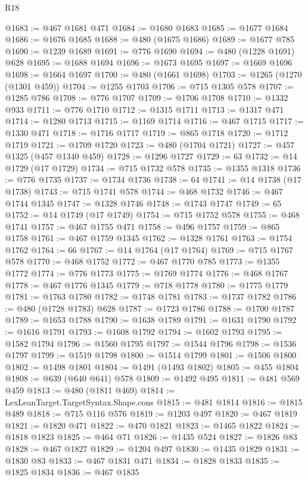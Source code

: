 \begin{lexlean}{R18}
\begin{coremodule}
{{{{{{{{{{{{{{{{{{{{{{{{{{{{{{{{{{{{{{{{{{{{{{{{{{{{{{{{{{{{{{{{{{{{{{{{{{{{{{{{{{{{{{{{{{{{{{{{{{{{{{{{{{{{{@1683 := @467 @1681 @471
@1684 := @1680 @1683
@1685 := @1677 @1684
@1686 := @1676 @1685
@1688 := @480 (@1675 @1686)
@1689 := @1677 @785
@1690 := @1239 @1689
@1691 := @776 @1690
@1694 := @480 (@1228 @1691) @628
@1695 := @1688 @1694
@1696 := @1673 @1695
@1697 := @1669 @1696
@1698 := @1664 @1697
@1700 := @480 (@1661 @1698)
@1703 := @1265 (@1270 (@1301 @459))
@1704 := @1255 @1703
@1706 := @715 @1305 @578
@1707 := @1285 @786
@1708 := @776 @1707
@1709 := @1706 @1708
@1710 := @1332 @933
@1711 := @776 @1710
@1712 := @1315 @1711
@1713 := @1317 @471
@1714 := @1280 @1713
@1715 := @1169 @1714
@1716 := @467 @1715
@1717 := @1330 @471
@1718 := @1716 @1717
@1719 := @865 @1718
@1720 := @1712 @1719
@1721 := @1709 @1720
@1723 := @480 (@1704 @1721)
@1727 := @457 @1325 (@457 @1340 @459)
@1728 := @1296 @1727
@1729 := 63
@1732 := @14 @1729 (@17 @1729)
@1734 := @715 @1732 @578
@1735 := @1355 @1318
@1736 := @776 @1735
@1737 := @1734 @1736
@1738 := 64
@1741 := @14 @1738 (@17 @1738)
@1743 := @715 @1741 @578
@1744 := @468 @1732
@1746 := @467 @1744 @1345
@1747 := @1328 @1746
@1748 := @1743 @1747
@1749 := 65
@1752 := @14 @1749 (@17 @1749)
@1754 := @715 @1752 @578
@1755 := @468 @1741
@1757 := @467 @1755 @471
@1758 := @496 @1757
@1759 := @865 @1758
@1761 := @467 @1759 @1345
@1762 := @1328 @1761
@1763 := @1754 @1762
@1764 := 66
@1767 := @14 @1764 (@17 @1764)
@1769 := @715 @1767 @578
@1770 := @468 @1752
@1772 := @467 @1770 @785
@1773 := @1355 @1772
@1774 := @776 @1773
@1775 := @1769 @1774
@1776 := @468 @1767
@1778 := @467 @1776 @1345
@1779 := @718 @1778
@1780 := @1775 @1779
@1781 := @1763 @1780
@1782 := @1748 @1781
@1783 := @1737 @1782
@1786 := @480 (@1728 @1783) @628
@1787 := @1723 @1786
@1788 := @1700 @1787
@1789 := @1653 @1788
@1790 := @1638 @1789
@1791 := @1631 @1790
@1792 := @1616 @1791
@1793 := @1608 @1792
@1794 := @1602 @1793
@1795 := @1582 @1794
@1796 := @1560 @1795
@1797 := @1544 @1796
@1798 := @1536 @1797
@1799 := @1519 @1798
@1800 := @1514 @1799
@1801 := @1506 @1800
@1802 := @1498 @1801
@1804 := @1491 (@1493 @1802)
@1805 := @455 @1804
@1808 := @639 (@640 @641) @578
@1809 := @1492 @495
@1811 := @481 @569 @459
@1813 := @480 (@1811 @469)
@1814 := LexLeanTarget.TargetSyntax.Shape.cons
@1815 := @481 @1814
@1816 := @1815 @489
@1818 := @715 @116 @576
@1819 := @1203 @497
@1820 := @467 @1819
@1821 := @1820 @471
@1822 := @470 @1821
@1823 := @1465 @1822
@1824 := @1818 @1823
@1825 := @464 @71
@1826 := @1435 @524
@1827 := @1826 @83
@1828 := @467 @1827
@1829 := @1204 @497
@1830 := @1435 @1829
@1831 := @1830 @83
@1833 := @467 @1831 @471
@1834 := @1828 @1833
@1835 := @1825 @1834
@1836 := @467 @1835
}}}}}}}}}}}}}}}}}}}}}}}}}}}}}}}}}}}}}}}}}}}}}}}}}}}}}}}}}}}}}}}}}}}}}}}}}}}}}}}}}}}}}}}}}}}}}}}}}}}}}}}}}}}}}
\end{coremodule}
\end{lexlean}

